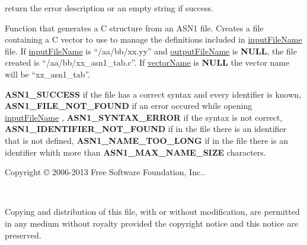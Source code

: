 \documentclass[]{article}
\let\realtextbf=\textbf
\renewcommand{\textbf}[1]{\textcolor{boldcolor}{\realtextbf{#1}}}
\renewcommand{\emph}[1]{\underline{#1}}
\begin{document}
\begin{description}
\itemsep1pt\parskip0pt
\item[char * error\_desc]
return the error description or an empty string if success.
\end{description}


Function that generates a C structure from an ASN1 file. Creates a file
containing a C vector to use to manage the definitions included in
\emph{inputFileName} file. If \emph{inputFileName} is ``/aa/bb/xx.yy''
and \emph{outputFileName} is \textbf{NULL}, the file created is
``/aa/bb/xx\_asn1\_tab.c''. If \emph{vectorName} is \textbf{NULL} the
vector name will be ``xx\_asn1\_tab''.


\textbf{ASN1\_SUCCESS} if the file has a correct syntax and every
identifier is known, \textbf{ASN1\_FILE\_NOT\_FOUND} if an error occured
while opening \emph{inputFileName} , \textbf{ASN1\_SYNTAX\_ERROR} if the
syntax is not correct, \textbf{ASN1\_IDENTIFIER\_NOT\_FOUND} if in the
file there is an identifier that is not defined,
\textbf{ASN1\_NAME\_TOO\_LONG} if in the file there is an identifier
whith more than \textbf{ASN1\_MAX\_NAME\_SIZE} characters.


Copyright © 2006-2013 Free Software Foundation, Inc..

~

Copying and distribution of this file, with or without modification, are
permitted in any medium without royalty provided the copyright notice
and this notice are preserved.

\end{document}
